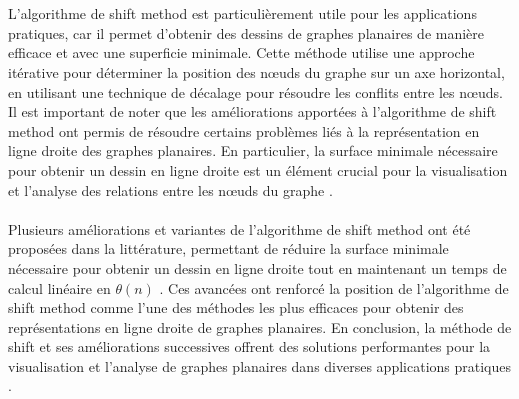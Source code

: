 \documentclass[hidelinks,letterpaper,12pt]{article}
\begin{document}
\\ \\
L'algorithme de shift method est particulièrement utile pour les applications pratiques, car il permet d'obtenir des dessins de graphes planaires de manière efficace et avec une superficie minimale. Cette méthode utilise une approche itérative pour déterminer la position des nœuds du graphe sur un axe horizontal, en utilisant une technique de décalage pour résoudre les conflits entre les nœuds. Il est important de noter que les améliorations apportées à l'algorithme de shift method ont permis de résoudre certains problèmes liés à la représentation en ligne droite des graphes planaires. En particulier, la surface minimale nécessaire pour obtenir un dessin en ligne droite est un élément crucial pour la visualisation et l'analyse des relations entre les nœuds du graphe \citep{TakaoSaidur}.
\\ \\
Plusieurs améliorations et variantes de l'algorithme de shift method ont été proposées dans la littérature, permettant de réduire la surface minimale nécessaire pour obtenir un dessin en ligne droite tout en maintenant un temps de calcul linéaire en $\theta(n)$ . Ces avancées ont renforcé la position de l'algorithme de shift method comme l'une des méthodes les plus efficaces pour obtenir des représentations en ligne droite de graphes planaires. En conclusion, la méthode de shift et ses améliorations successives offrent des solutions performantes pour la visualisation et l'analyse de graphes planaires dans diverses applications pratiques \citep{PhilippKindermann}.

\newpage
\end{document}
